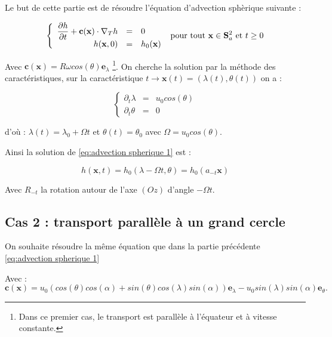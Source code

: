 Le but de cette partie est de résoudre l'équation d'advection sphèrique suivante :

\begin{equation}
\label{eq:advection spherique 1}
\left\lbrace
\begin{array}{r cl}
\dfrac{\partial h}{\partial t} + \mathbf{c} ( \mathbf{x} ) \cdot \nabla_ T h & = & 0 \\
h(\mathbf{x},0) & = & h_0 ( \mathbf{x} )
\end{array}
\right. \text{ pour tout } \mathbf{x} \in \mathbf{S}_a^2 \text{ et } t \geq 0
\end{equation}

Avec $\mathbf{c} ( \mathbf{x} ) = R \omega cos ( \theta ) \mathbf{e}_{\lambda}$ \footnote{Dans ce premier cas, le transport est parallèle à l'équateur et à vitesse constante.}.
On cherche la solution par la méthode des caractéristiques, sur la caractéristique $t \rightarrow\mathbf{x}(t) = (\lambda (t), \theta(t) )$ on a :

\begin{equation}
\left\lbrace
\begin{array}{rcl}
\partial_t \lambda & = & u_0 cos ( \theta ) \\
\partial_t \theta & = & 0
\end{array}
\right.
\end{equation}

d'où : $\lambda(t) = \lambda_0 + \Omega t$ et $\theta(t) = \theta_0$ avec $\Omega = u_0 cos ( \theta )$.

Ainsi la solution de \eqref{eq:advection spherique 1} est :

\begin{equation}
\label{eq: advection solution 1}
h( \mathbf{x}, t ) = h_0 ( \lambda - \Omega t, \theta ) = h_0 ( a_{-t}  \mathbf{x} )
\end{equation}

Avec $R_{-t}$ la rotation autour de l'axe $(Oz)$ d'angle $-\Omega t$.

\subsection{Cas 2 : transport parallèle à un grand cercle}

On souhaite résoudre la même équation que dans la partie précédente \eqref{eq:advection spherique 1}

Avec :
$$\mathbf{c} ( \mathbf{x} ) = u_0 ( cos ( \theta) cos ( \alpha ) + sin( \theta) cos ( \lambda) sin( \alpha) ) \mathbf{e}_{\lambda} - u_0 sin( \lambda) sin( \alpha) \mathbf{e}_{\theta}. $$

